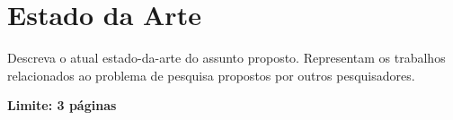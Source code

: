 \chapter{Estado da Arte}


Descreva o atual estado-da-arte do assunto proposto. Representam os trabalhos relacionados ao problema de pesquisa propostos por outros pesquisadores.
 
\textbf{Limite: 3 páginas}